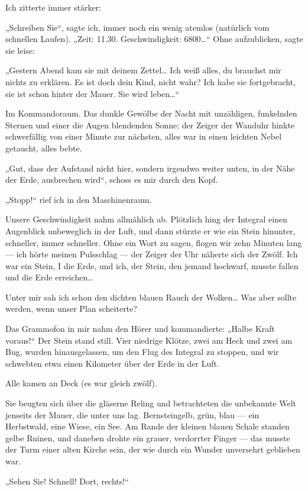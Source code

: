 Ich zitterte immer stärker:

„Schreiben Sie“, sagte ich, immer noch ein wenig atemlos (natürlich
vom schnellen Laufen). „Zeit: 11.30. Geschwindigkeit: 6800\ldots{}“
Ohne aufzublicken, sagte sie leise:

„Gestern Abend kam sie mit deinem Zettel\ldots{} Ich weiß alles, du
brauchst mir nichts zu erklären. Es ist doch dein Kind, nicht wahr?
Ich habe sie fortgebracht, sie ist schon hinter der Mauer. Sie wird
leben\ldots{}“

Im Kommandoraum. Das dunkle Gewölbe der Nacht mit unzähligen,
funkelnden Sternen und einer die Augen blendenden Sonne; der Zeiger
der Wanduhr hinkte schwerfällig von einer Minute zur nächsten,
alles war in einen leichten Nebel getaucht, alles bebte.

„Gut, dass
der Aufstand nicht hier, sondern irgendwo weiter unten, in der Nähe
der Erde, ausbrechen wird“, schoss es mir durch den Kopf.

„Stopp!“ rief ich in den Maschinenraum.

Unsere Geschwindigkeit nahm
allmählich ab. Plötzlich hing der Integral einen Augenblick
unbeweglich in der Luft, und dann stürzte er wie ein Stein
hinunter, schneller, immer schneller. Ohne ein Wort zu sagen,
flogen wir zehn Minuten lang — ich hörte meinen Pulsschlag — der
Zeiger der Uhr näherte sich der Zwölf. Ich war ein Stein, I die
Erde, und ich, der Stein, den jemand hochwarf, musste fallen und
die Erde erreichen\ldots{}

Unter mir sah ich schon den dichten blauen Rauch der Wolken\ldots{} Was
aber sollte werden, wenn unser Plan scheiterte?

Das Grammofon in mir nahm den Hörer und kommandierte: „Halbe Kraft
voraus!“ Der Stein stand still. Vier niedrige Klötze, zwei am Heck
und zwei am Bug, wurden hinausgelassen, um den Flug des Integral zu
stoppen, und wir schwebten etwa einen Kilometer über der Erde in
der Luft.

Alle kamen an Deck (es war gleich zwölf).

Sie beugten sich über die
gläserne Reling und betrachteten die unbekannte Welt jenseits der
Mauer, die unter uns lag. Bernsteingelb, grün, blau — ein
Herbstwald, eine Wiese, ein See. Am Rande der kleinen blauen Schale
standen gelbe Ruinen, und daneben drohte ein grauer, verdorrter
Finger — das musste der Turm einer alten
Kirche sein, der wie durch ein Wunder unversehrt geblieben war.

„Sehen Sie! Schnell! Dort, rechts!“

